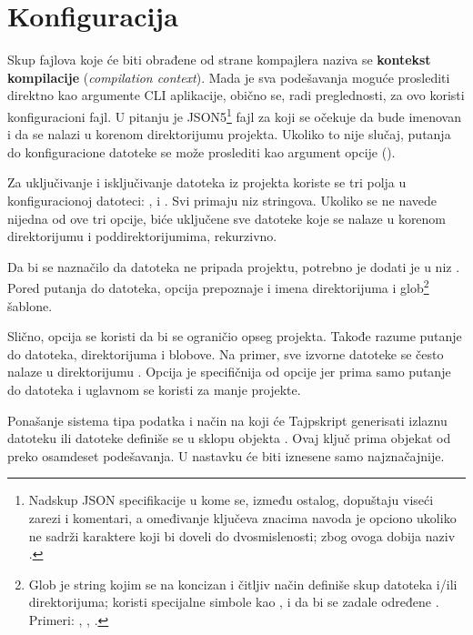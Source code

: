 \section{Konfiguracija}

Skup fajlova koje će biti obrađene od strane kompajlera naziva se \textbf{kontekst kompilacije} (\textsl{compilation context}).
Mada je sva podešavanja moguće proslediti direktno kao argumente CLI aplikacije, obično se, radi preglednosti, za ovo koristi konfiguracioni fajl.
U pitanju je JSON5\footnote{Nadskup JSON specifikacije u kome se, između ostalog, dopuštaju viseći zarezi i komentari, a omeđivanje ključeva znacima navoda je opciono ukoliko ne sadrži karaktere koji bi doveli do dvosmislenosti; zbog ovoga dobija naziv .} fajl za koji se očekuje da bude imenovan  i da se nalazi u korenom direktorijumu projekta.
Ukoliko to nije slučaj, putanja do konfiguracione datoteke se može proslediti kao argument opcije  ().

Za uključivanje i isključivanje datoteka iz projekta koriste se tri polja u konfiguracionoj datoteci: ,  i .
Svi primaju niz stringova.
Ukoliko se ne navede nijedna od ove tri opcije, biće uključene sve  datoteke koje se nalaze u korenom direktorijumu i poddirektorijumima, rekurzivno.

Da bi se naznačilo da datoteka ne pripada projektu, potrebno je dodati je u niz .
Pored putanja do datoteka,  opcija prepoznaje i imena direktorijuma i glob\footnote{Glob je string kojim se na koncizan i čitljiv način definiše skup datoteka i/ili direktorijuma; koristi specijalne simbole kao \code{*}, \code{**} i  da bi se zadale određene . Primeri: , , .} šablone.

Slično,  opcija se koristi da bi se ograničio opseg projekta.
Takođe razume putanje do datoteka, direktorijuma i blobove.
Na primer, sve izvorne datoteke se često nalaze u direktorijumu .
Opcija  je specifičnija od opcije  jer prima samo putanje do datoteka i uglavnom se koristi za manje projekte.

Ponašanje sistema tipa podatka i način na koji će Tajpskript generisati izlaznu datoteku ili datoteke definiše se u sklopu objekta .
Ovaj ključ prima objekat od preko osamdeset podešavanja.
U nastavku će biti iznesene samo najznačajnije. %

